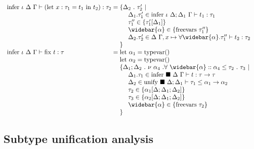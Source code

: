 \documentclass[manuscript]{acmart}
\begin{document}
\[\begin{array}{l @{} l}
    \text{infer } \iota\ \Delta\ \Gamma \vdash 
    (\text{let}\ x : \tau_1 = t_1 \text{ in } t_2) : \tau_2
    &{} =
    \begin{array}[t]{@{} l}
      \{ \Delta_2\ .\ \tau_2' \ |\ 
      \\
      \ \ \ \ \Delta_1.\tau_1' \in \text{infer } \iota\ \Delta;\Delta_1\ \Gamma \vdash t_1 : \tau_1
      \\ 
      \ \ \ \ \tau_1'' \in \{\tau_1'[\Delta_1]\}
      \\ 
      \ \ \ \ \widebar{\alpha} \in \{\text{freevars}\ \tau_1''\}
      \\ 
      \ \ \ \ \Delta_2.\tau_2' \in \Delta\ \Gamma,x \mapsto \forall \widebar{\alpha} . \tau_1''
        \vdash t_2 : \tau_2 
      \\
      \} 
    \end{array}
    \\

    \text{infer } \iota\ \Delta\ \Gamma \vdash 
    \text{fix } t : \tau      
    &{} =
    \begin{array}[t]{@{} l}
      \text{let } \alpha_1 = \text{typevar}()
      \\
      \text{let } \alpha_2 = \text{typevar}()
      \\
      \{ \Delta_1;\Delta_2\ .\ \nu\ \alpha_4 \ . \forall\ \widebar{\alpha} ::
        \alpha_4 \leq \tau_2\ .\ \tau_3
        \ |\ 
      \\
      \ \ \ \ \Delta_1.\tau_1 \in
      \text{infer } \blacksquare\ \Delta\ \Gamma \vdash t : \tau \rightarrow \tau
      \\
      \ \ \ \ \Delta_2 \in \text{unify } \blacksquare\ \Delta;\Delta_1 \vdash 
      \tau_1 \leq \alpha_1 \rightarrow \alpha_2 
      \\
      \ \ \ \ \tau_2 \in \{\alpha_1[\Delta;\Delta_1;\Delta_2]\}
      \\ 
      \ \ \ \ \tau_3 \in \{\alpha_2[\Delta;\Delta_1;\Delta_2]\} 
      \\
      \ \ \ \ \widebar{\alpha} \in \{ \text{freevars}\ \tau_2 \}
      \\
      \} 
    \end{array}
  \end{array}
\]


\subsection{Subtype unification analysis}
\end{document}
